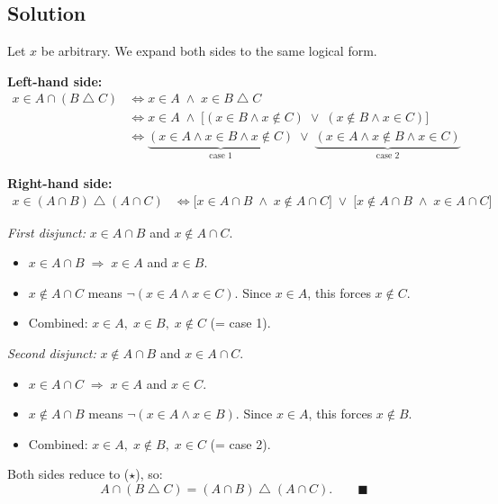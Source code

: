 \documentclass[12pt, a4paper]{article}
\newcommand{\symdiff}{\mathbin{\triangle}}
\begin{document}
\subsection*{Solution}

Let $x$ be arbitrary. We expand both sides to the same logical form.

\textbf{Left-hand side:}
\begin{align*}
  x \in A \cap (B \symdiff C)
  &\iff x \in A \;\land\; x \in B \symdiff C \\
  &\iff x \in A \;\land\;
        \bigl[(x \in B \land x \notin C)
        \;\lor\; (x \notin B \land x \in C)\bigr] \\
  &\iff \underbrace{(x \in A \land x \in B \land x \notin C)}_{\text{case 1}}
        \;\lor\;
        \underbrace{(x \in A \land x \notin B \land x \in C)}_{\text{case 2}}
        \tag{$\star$}
\end{align*}

\textbf{Right-hand side:}
\begin{align*}
  x \in (A \cap B) \symdiff (A \cap C)
  &\iff \bigl[x \in A \cap B \;\land\; x \notin A \cap C\bigr]
        \;\lor\;
        \bigl[x \notin A \cap B \;\land\; x \in A \cap C\bigr]
\end{align*}

\emph{First disjunct:}\; $x \in A \cap B$ and $x \notin A \cap C$.
\begin{itemize}[nosep]
  \item $x \in A \cap B \;\Longrightarrow\; x \in A$ and $x \in B$.
  \item $x \notin A \cap C$ means $\lnot(x \in A \land x \in C)$.
        Since $x \in A$, this forces $x \notin C$.
  \item Combined: $x \in A,\; x \in B,\; x \notin C$ \;(= case 1).
\end{itemize}

\emph{Second disjunct:}\; $x \notin A \cap B$ and $x \in A \cap C$.
\begin{itemize}[nosep]
  \item $x \in A \cap C \;\Longrightarrow\; x \in A$ and $x \in C$.
  \item $x \notin A \cap B$ means $\lnot(x \in A \land x \in B)$.
        Since $x \in A$, this forces $x \notin B$.
  \item Combined: $x \in A,\; x \notin B,\; x \in C$ \;(= case 2).
\end{itemize}

Both sides reduce to ($\star$), so:
\[
  A \cap (B \symdiff C) = (A \cap B) \symdiff (A \cap C).
  \qquad\blacksquare
\]
\end{document}
